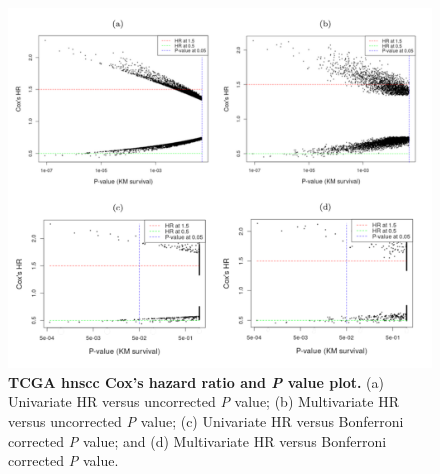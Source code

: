 \documentclass[jpm,article,submit,moreauthors,pdftex]{Definitions/mdpi}
\newcommand{\bcaption}[2]{\caption{\textbf{#1} #2}}
\begin{document}
\begin{figure}[hp]
\centering
\includegraphics[width=14cm]{Figure2.pdf}
\bcaption{TCGA \acrshort{hnscc} Cox's hazard ratio and \textit{P} value plot.}
{(a) Univariate HR versus uncorrected \textit{P} value; (b) Multivariate HR versus uncorrected \textit{P} value; (c) Univariate HR versus Bonferroni corrected \textit{P} value; and (d) Multivariate HR versus Bonferroni corrected \textit{P} value.}
\label{fig:figure2}
\end{figure}


\end{document}
